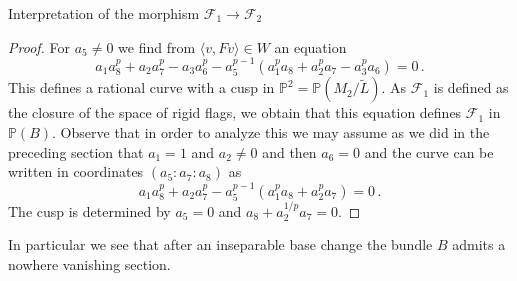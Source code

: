 \documentclass[11pt]{amsart}
\numberwithin{equation}{section}
\newcommand{\PP}{\mathbb P}
\theoremstyle{definition}
\theoremstyle{remark}
\begin{document}
\begin{section}{Interpretation of the
morphism $\mathcal{F}_1 \to \mathcal{F}_2$}
\begin{proof}
For $a_5\neq 0$ we find from $\langle v, Fv\rangle \in W$ an equation 
$$
a_1a_8^p+a_2a_7^p-a_3a_6^p -a_5^{p-1}(a_1^pa_8+a_2^pa_7-a_3^pa_6)=0\, .
$$
This defines a rational curve with a cusp in ${\PP}^2={\PP}(M_2/\tilde{L})$.
As $\mathcal{F}_1$ is defined as the closure of the space of rigid flags,
we obtain that this equation defines $\mathcal{F}_1$ in ${\PP}(B)$.
Observe that in order to analyze this we may assume as we did in the 
preceding section that
$a_1=1$ and $a_2\neq 0$ and then $a_6=0$ and the curve can be written 
in coordinates $(a_5:a_7:a_8)$ as
$$
a_1a_8^p+a_2a_7^p -a_5^{p-1}(a_1^pa_8+a_2^pa_7)=0\, .
$$
The cusp is determined by $a_5=0$ and $a_8+a_2^{1/p}a_7=0$. 
\end{proof}

In particular we see that after an inseparable base change the bundle $B$
admits a nowhere vanishing section.  
\end{section}
\end{document}

